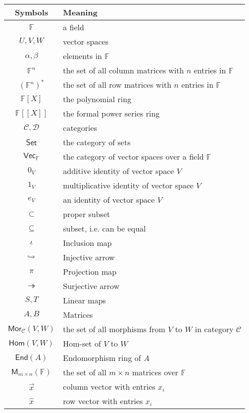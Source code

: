 \documentclass[
	11pt, %
	fleqn, %
	a4paper, %
]{LegrandOrangeBook}
\newcommand{\End}[1]{\mathsf{End}(#1)} %
\newcommand{\Hom}{\mathsf{Hom}} %
\newcommand{\F}{\mathbb{F}} %
\newcommand{\M}[2]{\mathsf{M}_{#1}(#2)} %
\newcommand{\C}{\mathcal{C}} %
\newcommand{\D}{\mathcal{D}} %
\newcommand{\Set}{\boldsymbol{\mathsf{Set}}} %
\newcommand{\Vect}{\boldsymbol{\mathsf{Vec}}} %
\newcommand{\Mor}{\mathsf{Mor}} %
\begin{document}
\noindent \begin{tabularx}{\textwidth}{cX}
    \toprule
    \textbf{Symbols} & \textbf{Meaning} \\
    \midrule
    $\F$ & a field \\
    $U, V, W$ & vector spaces \\
    $\alpha, \beta$ & elements in $\F$ \\
    $\F^n$ & the set of all column matrices with $n$ entries in $\F$ \\
    $(\F^n)^*$ & the set of all row matrices with $n$ entries in $\F$ \\
    $\F[X]$ & the polynomial ring \\
    $\F[[X]]$ & the formal power series ring \\
    \midrule
    $\C, \D$ & categories \\
    $\Set$ & the category of sets \\
    $\Vect_{\F}$ & the category of vector spaces over a field $\F$ \\
    \midrule
    $0_V$ & additive identity of vector space $V$ \\
    $1_V$ & multiplicative identity of vector space $V$ \\
    $e_V$ & an identity of vector space $V$ \\
    \midrule
    $\subset$ & proper subset \\
    $\subseteq$ & subset, i.e. can be equal \\
    \midrule
    $\iota$ & Inclusion map \\
    $\xhookrightarrow{}$ & Injective arrow \\
    $\pi$ & Projection map \\
    $\twoheadrightarrow$ & Surjective arrow \\
    \midrule
    $S, T$ & Linear maps \\
    $A, B$ & Matrices \\
    \midrule
    $\Mor_{\C}(V, W)$ & the set of all morphisms from $V$ to $W$ in category $\C$ \\
    $\Hom(V, W)$ & Hom-set of $V$ to $W$ \\
    $\End{A}$ & Endomorphism ring of $A$ \\
    $\M{m \times n}{\F}$ & the set of all $m \times n$ matrices over $\F$ \\
    \midrule
    $\vec{x}$ & column vector with entries $x_i$ \\
    $\hat{x}$ & row vector with entries $x_i$ \\

\end{tabularx}
\end{document}
